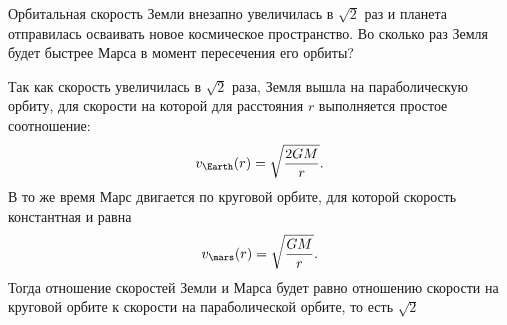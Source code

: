 \begin{task}{1}
    Орбитальная скорость Земли внезапно увеличилась в $\sqrt{2}$ раз и планета отправилась осваивать новое космическое пространство. Во сколько раз Земля будет быстрее Марса в момент пересечения его орбиты?
\end{task}

\begin{solution}
    Так как скорость увеличилась в $\sqrt{2}$ раза, Земля вышла на параболическую орбиту, для скорости на которой для расстояния $r$ выполняется простое соотношение:
    $$
    v_{\Earth}(r) = \sqrt{\frac{2GM}{r}}.
    $$
    В то же время Марс двигается по круговой орбите, для которой скорость константная и равна
    $$
    v_{\mars}(r) = \sqrt{\frac{GM}{r}}.
    $$
    Тогда отношение скоростей Земли и Марса будет равно отношению скорости на круговой орбите к скорости на параболической орбите, то есть $\sqrt{2}$
\end{solution}

